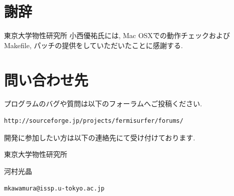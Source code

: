 \documentclass[12pt]{jarticle}
\begin{document}
\section{謝辞}

東京大学物性研究所 小西優祐氏には, Mac OSXでの動作チェックおよびMakefile, 
パッチの提供をしていただいたことに感謝する.

\section{問い合わせ先}

プログラムのバグや質問は以下のフォーラムへご投稿ください.
\begin{verbatim}
http://sourceforge.jp/projects/fermisurfer/forums/
\end{verbatim}

開発に参加したい方は以下の連絡先にて受け付けております. 

東京大学物性研究所

河村光晶

\verb|mkawamura@issp.u-tokyo.ac.jp|
\end{document}
